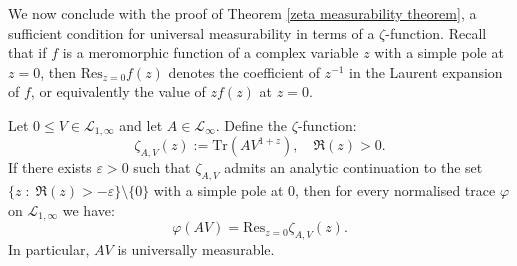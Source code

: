     We now conclude with the proof of Theorem \ref{zeta measurability theorem}, a sufficient condition for universal measurability in terms of a $\zeta$-function.
    {Recall that if $f$ is a meromorphic function of a complex variable $z$ with a simple pole at $z = 0$, then $\mathrm{Res}_{z=0} f(z)$ denotes the coefficient of $z^{-1}$ in the Laurent
    expansion of $f$, or equivalently the value of $zf(z)$ at $z=0$.}
    \begin{thm*}%
        Let $0\leq V\in\mathcal{L}_{1,\infty}$ and let $A\in\mathcal{L}_{\infty}.$ 
        Define the $\zeta$-function: 
        \begin{equation*}
            \zeta_{A,V}(z) := \mathrm{Tr}(AV^{1+z}),\quad \Re(z) > 0.
        \end{equation*}
        If there exists $\varepsilon > 0$ such that $\zeta_{A,V}$ admits an analytic continuation to the set $\{z\;:\; \Re(z) > -\varepsilon\}\setminus \{0\}$
        with a simple pole at $0$, then for every normalised trace $\varphi$ on $\mathcal{L}_{1,\infty}$ we have:
        \begin{equation*}
            \varphi(AV)= \mathrm{Res}_{z=0}\zeta_{A,V}(z).
        \end{equation*}
        In particular, $AV$ is universally measurable.
    \end{thm*}
